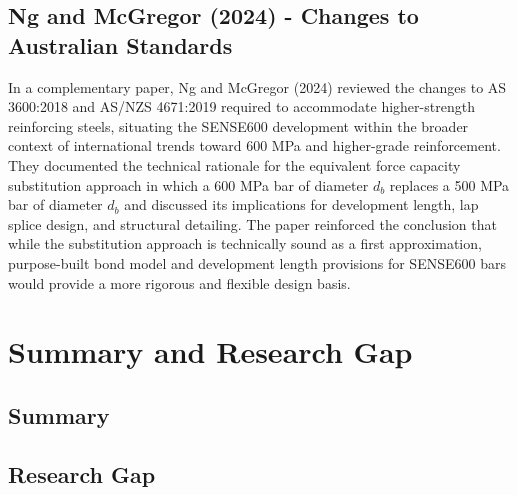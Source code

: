 \subsection{Ng and McGregor (2024) - Changes to Australian Standards}
In a complementary paper, Ng and McGregor (2024) reviewed the changes to AS 3600:2018 and AS/NZS 4671:2019 required to accommodate higher-strength reinforcing steels, situating the SENSE600 development within the broader context of international trends toward 600 MPa and higher-grade reinforcement. They documented the technical rationale for the equivalent force capacity substitution approach in which a 600 MPa bar of diameter $d_{b}$ replaces a 500 MPa bar of diameter $d_{b}$ and discussed its implications for development length, lap splice design, and structural detailing. The paper reinforced the conclusion that while the substitution approach is technically sound as a first approximation, purpose-built bond model and development length provisions for SENSE600 bars would provide a more rigorous and flexible design basis.

\section{Summary and Research Gap}
\subsection{Summary}

\subsection{Research Gap}